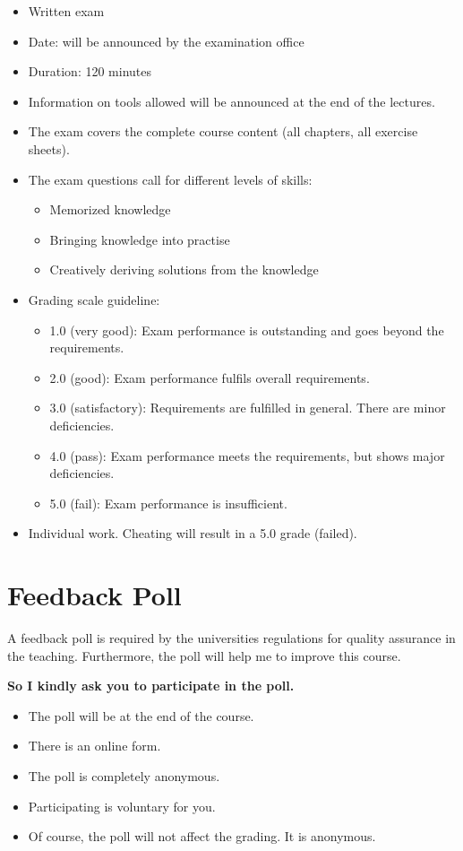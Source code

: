 \begin{itemize}
	\item Written exam
	\item Date: will be announced by the examination office
	\item Duration: 120 minutes
	\item Information on tools allowed will be announced at the end of the lectures.
	\item The exam covers the complete course content (all chapters, all exercise sheets).
	\item The exam questions call for different levels of skills:
	\begin{itemize}
		\item Memorized knowledge
		\item Bringing knowledge into practise
		\item Creatively deriving solutions from the knowledge
	\end{itemize}
	\item Grading scale guideline:
	\begin{itemize}
		\item 1.0 (very good): Exam performance is outstanding and goes beyond the requirements.
		\item 2.0 (good): Exam performance fulfils overall requirements.
		\item 3.0 (satisfactory): Requirements are fulfilled in general. There are minor deficiencies.
		\item 4.0 (pass): Exam performance meets the requirements, but shows major deficiencies.
		\item 5.0 (fail): Exam performance is insufficient.
	\end{itemize}
	\item Individual work. Cheating will result in a 5.0 grade (failed).
\end{itemize}


\section{Feedback Poll}

A feedback poll is required by the universities regulations for quality assurance in the teaching. Furthermore, the poll will help me to improve this course.

\textbf{So I kindly ask you to participate in the poll.}

\begin{itemize}
	\item The poll will be at the end of the course.
	\item There is an online form.
	\item The poll is completely anonymous.
	\item Participating is voluntary for you.
	\item Of course, the poll will not affect the grading. It is anonymous.
\end{itemize}
